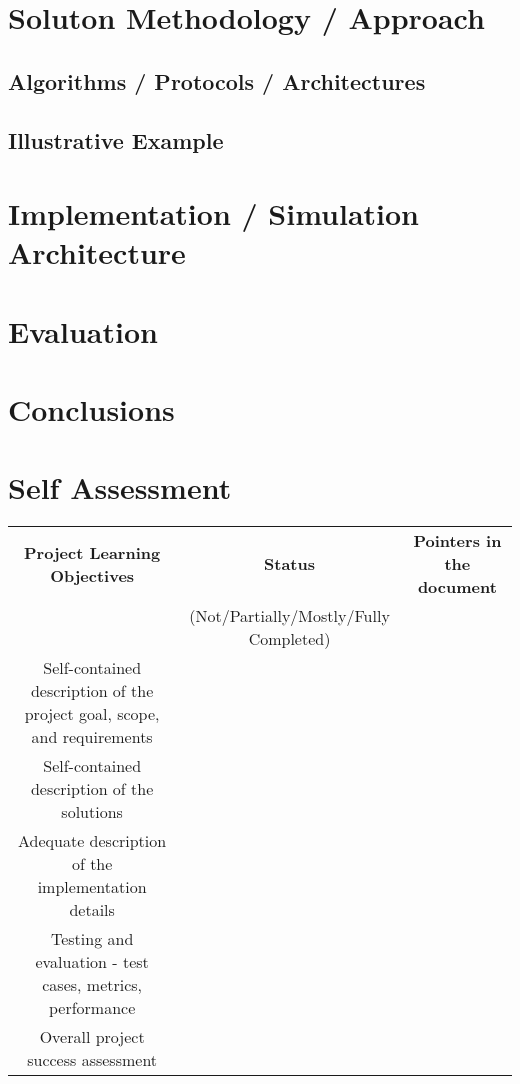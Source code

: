 \documentclass[conference]{IEEEtran}
\begin{document}
    \section{Soluton Methodology / Approach}

    \subsection{Algorithms / Protocols / Architectures}

    \subsection{Illustrative Example}

    \section{Implementation / Simulation Architecture}

    \section{Evaluation}

    \section{Conclusions}

    \section{Self Assessment}
    \begin{table}[htbp]
        \centering
        \label{tab:self-assmt}
        \begin{tabular}{|c|c|c|}
            \hline
            \textbf{Project Learning Objectives} & \textbf{Status} & \textbf{Pointers in the document} \\
             & (Not/Partially/Mostly/Fully Completed) &  \\
            \hline
            Self-contained description of the project goal, scope, and requirements & & \\
            \hline
            Self-contained description of the solutions & & \\
            \hline
            Adequate description of the implementation details & & \\
            \hline
            Testing and evaluation - test cases, metrics, performance & & \\
            \hline
            Overall project success assessment & & \\
            \hline
        \end{tabular}

    \end{table}
\end{document}
